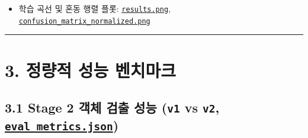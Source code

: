 \documentclass[10.5pt,a4paper]{article}
\begin{document}
\begin{itemize}[leftmargin=1.5em,itemsep=2pt]
\item 학습 곡선 및 혼동 행렬 플롯: \href{https://github.com/Heisnotanimposter/Totalcare\_autonomous\_driving\_Yolov5/blob/main/results/v2\_improved/outputs/train\_results/results.png}{\texttt{results.\allowbreak{}png}}, \href{https://github.com/Heisnotanimposter/Totalcare\_autonomous\_driving\_Yolov5/blob/main/results/v2\_improved/outputs/train\_results/confusion\_matrix\_normalized.png}{\texttt{confusion\_\allowbreak{}matrix\_\allowbreak{}normalized.\allowbreak{}png}}
\end{itemize}

\par\noindent\rule{\textwidth}{0.4pt}\par\medskip

\section{3. 정량적 성능 벤치마크}

\subsection{3.1 Stage 2 객체 검출 성능 (\texttt{v1} vs \texttt{v2}, \href{https://github.com/Heisnotanimposter/Totalcare\_autonomous\_driving\_Yolov5/blob/main/results/v2\_improved/outputs/eval\_metrics.json}{\texttt{eval\_\allowbreak{}metrics.\allowbreak{}json}})}
\end{document}
